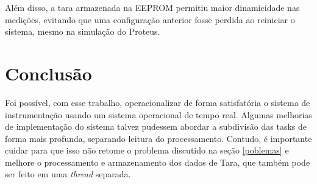 \documentclass[a4paper, 12pt]{article}
\begin{document}
	Além disso, a tara armazenada na EEPROM permitiu maior dinamicidade nas medições, evitando que uma configuração anterior fosse perdida ao reiniciar o sistema, mesmo na simulação do Proteus.  
	
	\section{Conclusão}
	Foi possível, com esse trabalho, operacionalizar de forma satisfatória o sistema de instrumentação usando um sistema operacional de tempo real. Algumas melhorias de implementação do sistema talvez pudessem abordar a subdivisão das tasks de forma mais profunda, separando leitura do processamento. Contudo, é importante cuidar para que isso não retome o problema discutido na seção \ref{poblemas} e melhore o processamento e armazenamento dos dados de Tara, que também pode ser feito em uma \textit{thread} separada. 
	
	
\end{document}
